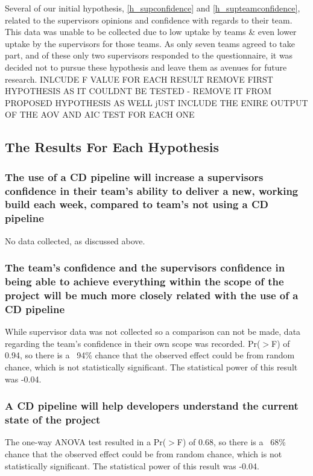 \documentclass[journal]{IEEEtran}
\begin{document}
    Several of our initial hypothesis, \ref{h_supconfidence} and \ref{h_supteamconfidence}, related to the supervisors opinions and confidence with regards to their team. This data was unable to be collected due to low uptake by teams \& even lower uptake by the supervisors for those teams. As only seven teams agreed to take part, and of these only two supervisors responded to the questionnaire, it was decided not to pursue these hypothesis and leave them as avenues for future research.
    INLCUDE F VALUE FOR EACH RESULT
    REMOVE FIRST HYPOTHESIS AS IT COULDNT BE TESTED - REMOVE IT FROM PROPOSED HYPOTHESIS AS WELL
    jUST INCLUDE THE ENIRE OUTPUT OF THE AOV AND AIC TEST FOR EACH ONE
    \subsection*{The Results For Each Hypothesis}
        \subsubsection{The use of a CD pipeline will increase a supervisors confidence in their team's ability to deliver a new, working build each week, compared to team's not using a CD pipeline}
            No data collected, as discussed above. \\

        \subsubsection{The team's confidence and the supervisors confidence in being able to achieve everything within the scope of the project will be much more closely related with the use of a CD pipeline}
            While supervisor data was not collected so a comparison can not be made, data regarding the team's confidence in their own scope was recorded. Pr($>$F) of 0.94, so there is a ~94\% chance that the observed effect could be from random chance, which is not statistically significant. The statistical power of this result was -0.04. \\

        \subsubsection{A CD pipeline will help developers understand the current state of the project}
            The one-way ANOVA test resulted in a Pr($>$F) of 0.68, so there is a ~68\% chance that the observed effect could be from random chance, which is not statistically significant. The statistical power of this result was -0.04. \\
\end{document}
